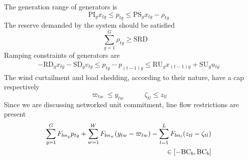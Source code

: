 The generation range of generators is
\begin{equation}
    \textrm{PI}_g x_{tg} \le p_{tg} \le \textrm{PS}_g x_{tg} - \rho_{tg}
\end{equation}
The reserve demanded by the system should be satisfied
\begin{equation}
    \sum_{g = 1}^{G} \rho_{tg} \ge \textrm{SRD} \quad
\end{equation}
Ramping constraints of generators are 
\begin{align}
    -\textrm{RD}_g x_{tg} -\textrm{SD}_g v_{tg} \le p_{tg} - p_{(t-1)g} \le \textrm{RU}_g x_{(t-1)g} + \textrm{SU}_g u_{tg}
\end{align}
The wind curtailment and load shedding, according to their nature, have a cap respectively
\begin{equation}
    \varpi_{tw} \le y_{tw} \quad \quad \quad  \zeta_{tl} \le z_{tl}
\end{equation}
Since we are discussing networked unit commitment, line flow restrictions are present
\begin{align}\label{BCinterval}
    \sum_{g=1}^{G} F_{bn_g} p_{tg} + \sum_{w=1}^{W} F_{bn_w} (y_{tw} - \varpi_{tw}) - \sum_{l=1}^{L} F_{bn_l} (z_{tl} - \zeta_{tl}) \notag \\
    \in [ -\textrm{BC}_b, \textrm{BC}_b ]
\end{align}




